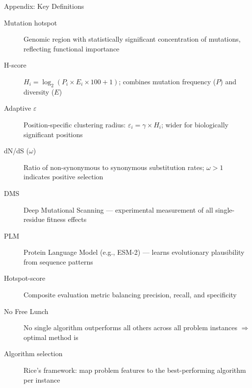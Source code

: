 \begin{frame}[noframenumbering]{Appendix: Key Definitions}
  \small
  \begin{description}
    \item[Mutation hotspot] Genomic region with statistically significant concentration of mutations, reflecting functional importance
    \item[H-score] $H_i = \log_2(P_i \times E_i \times 100 + 1)$; combines mutation frequency ($P$) and diversity ($E$)
    \item[Adaptive $\varepsilon$] Position-specific clustering radius: $\varepsilon_i = \gamma \times H_i$; wider for biologically significant positions
    \item[dN/dS ($\omega$)] Ratio of non-synonymous to synonymous substitution rates; $\omega > 1$ indicates positive selection
    \item[DMS] Deep Mutational Scanning --- experimental measurement of all single-residue fitness effects
    \item[PLM] Protein Language Model (e.g., ESM-2) --- learns evolutionary plausibility from sequence patterns
    \item[Hotspot-score] Composite evaluation metric balancing precision, recall, and specificity
    \item[No Free Lunch] No single algorithm outperforms all others across all problem instances $\Rightarrow$ optimal method is 
    \item[Algorithm selection] Rice's framework: map problem features to the best-performing algorithm per instance
  \end{description}
\end{frame}
